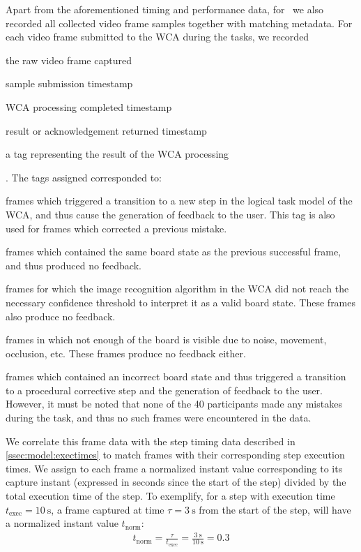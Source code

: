 Apart from the aforementioned timing and performance data, for~\cite{olguinmunoz:impact2021} we also recorded all collected video frame samples together with matching metadata.
For each video frame submitted to the \ac{WCA} during the tasks, we recorded
\begin{enumerate*}[itemjoin={{; }}, itemjoin*={{; and }}]
    \item the raw video frame captured
    \item sample submission timestamp
    \item \ac{WCA} processing completed timestamp
    \item result or acknowledgement returned timestamp
    \item a tag representing the result of the \ac{WCA} processing
\end{enumerate*}.
The tags assigned corresponded to:
\begin{description}[font={\bfseries\ttfamily}]
    \item[SUCCESS:] frames which triggered a transition to a new step in the logical task model of the \ac{WCA}, and thus cause the generation of feedback to the user.
        This tag is also used for frames which corrected a previous mistake.
    \item[REPEAT:] frames which contained the same board state as the previous successful frame, and thus produced no feedback.
    \item[LOW\_CONFIDENCE] frames for which the image recognition algorithm in the \ac{WCA} did not reach the necessary confidence threshold to interpret it as a valid board state.
        These frames also produce no feedback.
    \item[BLANK] frames in which not enough of the board is visible due to noise, movement, occlusion, etc.
        These frames produce no feedback either.
    \item[TASK\_ERROR] frames which contained an incorrect board state and thus triggered a transition to a procedural corrective step and the generation of feedback to the user.
        However, it must be noted that none of the \num{40} participants made any mistakes during the task, and thus no such frames were encountered in the data.
\end{description}

We correlate this frame data with the step timing data described in \cref{ssec:model:exectimes} to match frames with their corresponding step execution times.
We assign to each frame a normalized instant value corresponding to its capture instant (expressed in seconds since the start of the step) divided by the total execution time of the step.
To exemplify, for a step with execution time \( t_\text{exec} = \SI{10}{\second} \), a frame captured at time \( \tau = \SI{3}{\second} \) from the start of the step, will have a normalized instant value \( t_\text{norm} \):
\begin{align}
    t_\text{norm} = \frac{\tau}{t_\text{exec}} = \frac{\SI{3}{\second}}{\SI{10}{\second}} = 0.3
\end{align}

